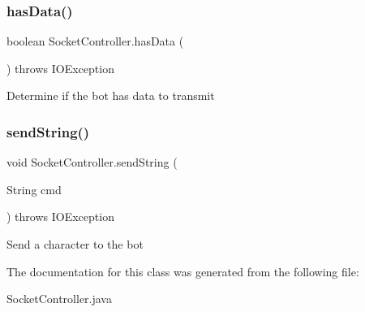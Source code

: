 \subsubsection{\texorpdfstring{has\+Data()}{hasData()}}
{\footnotesize\ttfamily boolean Socket\+Controller.\+has\+Data (\begin{DoxyParamCaption}{ }\end{DoxyParamCaption}) throws I\+O\+Exception\hspace{0.3cm}{\ttfamily [inline]}}

Determine if the bot has data to transmit \mbox{\label{class_socket_controller_ab4e8320da2db8f611a402ca668785c29}} 
\subsubsection{\texorpdfstring{send\+String()}{sendString()}}
{\footnotesize\ttfamily void Socket\+Controller.\+send\+String (\begin{DoxyParamCaption}\item[{String}]{cmd }\end{DoxyParamCaption}) throws I\+O\+Exception\hspace{0.3cm}{\ttfamily [inline]}}

Send a character to the bot 

The documentation for this class was generated from the following file\+:\begin{DoxyCompactItemize}
\item 
Socket\+Controller.\+java\end{DoxyCompactItemize}
